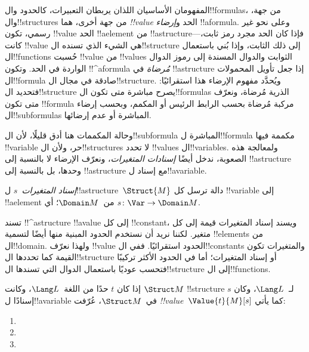 \documentclass[../../../include/open-logic-section]{subfiles}
\begin{document}


\begin{explain}
المفهومان الأساسيان اللذان يربطان التعبيرات، كالحدود
وال!!{formula}s، من جهة، وال!!{structure}s من جهة أخرى، هما
\emph{!!{value}} الحد و\emph{إرضاء} !!a{formula}. وعلى نحو غير
رسمي، تكون !!{value} الحد !!a{element} من !!a{structure}---فإذا كان
الحد مجرد رمز ثابت، كانت !!{value} هي الشيء الذي تسنده
ال!!{structure} إلى ذلك الثابت، وإذا بُني باستعمال ال!!{function}s
حُسبت !!{value} من !!{value}s الثوابت والدوال المسندة إلى رموز الدوال
الواردة في الحد. وتكون !!^a{formula}
\emph{مُرضاة} في !!a{structure} إذا جعل تأويل المحمولات
ال!!{formula} صادقة في مجال ال!!{structure}. ويُحدَّد مفهوم الإرضاء
هذا استقرائيًا: فتحديد ال!!{structure} يصرح مباشرة متى تكون
ال!!{formula}s الذرية مُرضاة، ونعرّف متى تكون !!{formula} مركبة
مُرضاة بحسب الرابط الرئيس أو المكمم، وبحسب إرضاء ال!!{subformula}s
المباشرة أو عدم إرضائها.

وحالة المكممات هنا أدق قليلًا، لأن ال!!{subformula} المباشرة
ل!!{formula} مكممة فيها !!{variable} حر، ولأن ال!!{structure}s لا
تحدد !!{value}s ال!!{variable}s. ولمعالجة هذه الصعوبة، ندخل أيضًا
\emph{إسنادات المتغيرات}، ونعرّف الإرضاء لا بالنسبة إلى
!!a{structure} وحدها، بل بالنسبة إلى !!a{structure} مع إسناد
ل!!a{variable}.
\end{explain}

\begin{defn}
\emph{إسناد المتغيرات}~$s$ ل!!a{structure}~$\Struct{M}$ دالة ترسل
كل !!{variable} إلى !!a{element} من~$\Domain M$؛ أي
$s\colon \Var \to \Domain M$.
\end{defn}

\begin{explain}
تسند !!^a{structure} !!a{value} إلى كل !!{constant}، ويسند إسناد
المتغيرات قيمة إلى كل متغير. لكننا نريد أن نستخدم الحدود المبنية
منها أيضًا لتسمية !!{element}s من ال!!{domain}. ولهذا نعرّف
!!{value} الحدود استقرائيًا. ففي ال!!{constant}s والمتغيرات تكون
القيمة كما تحددها ال!!{structure} أو إسناد المتغيرات؛ أما في الحدود
الأكثر تركيبًا فتحسب عوديًا باستعمال الدوال التي تسندها
ال!!{structure} إلى ال!!{function}s.
\end{explain}

\begin{defn}
إذا كان $t$ حدًا من اللغة~$\Lang L$، وكانت $\Struct M$
!!{structure} لـ~$\Lang L$، وكان $s$ إسنادًا ل!!a{variable}
في~$\Struct M$، عُرّفت \emph{!!{value}}~$\Value{t}{M}[s]$ كما يأتي:
\begin{enumerate}
\item {}
\item {}
\item {}
\end{enumerate}
\end{defn}
\end{document}
